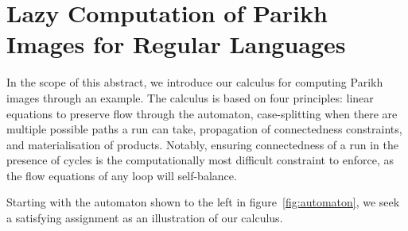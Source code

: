 \documentclass{easychair}
\begin{document}
\section{Lazy Computation of Parikh Images for Regular Languages}
In the scope of this abstract, we introduce our calculus for computing
Parikh images through an example.
The calculus is based on four principles: linear equations to preserve flow
through the automaton, case-splitting when there are multiple possible paths a
run can take, propagation of connectedness constraints, and materialisation of
products. Notably, ensuring connectedness of a run in the presence of cycles is
the computationally most difficult constraint to enforce, as the flow equations
of any loop will self-balance.

Starting with the automaton shown to the left in figure~\ref{fig:automaton}, we
seek a satisfying assignment as an illustration of our calculus.
\end{document}
